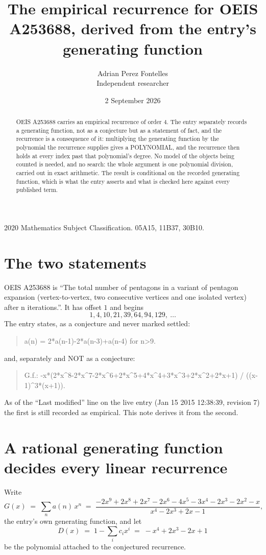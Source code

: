 \documentclass[11pt,a4paper]{article}
\title{The empirical recurrence for OEIS A253688, derived from the entry's generating function}
\author{Adrian Perez Fontelles\\ \small Independent researcher}
\date{2 September 2026}
\theoremstyle{plain}
\theoremstyle{definition}
\begin{document}
\maketitle

\begin{abstract}
OEIS A253688 carries an empirical recurrence of order $4$. The entry separately records a
generating function, not as a conjecture but as a statement of fact, and the recurrence is a
consequence of it: multiplying the generating function by the polynomial the recurrence
supplies gives a POLYNOMIAL, and the recurrence then holds at every index past that
polynomial's degree. No model of the objects being counted is needed, and no search: the
whole argument is one polynomial division, carried out in exact arithmetic. The result is
conditional on the recorded generating function, which is what the entry asserts and what is
checked here against every published term.
\end{abstract}

\noindent\small 2020 Mathematics Subject Classification. 05A15, 11B37, 30B10.\normalsize

\section{The two statements}

OEIS A253688 is ``The total number of pentagons in a variant of pentagon expansion (vertex-to-vertex, two consecutive vertices and one isolated vertex) after n iterations.''. It has offset $1$ and begins
\[
1, 4, 10, 21, 39, 64, 94, 129,\ \dots
\]
The entry states, as a conjecture and never marked settled:
\begin{quote}
a(n) = 2*a(n-1)-2*a(n-3)+a(n-4) for n>9.
\end{quote}
and, separately and NOT as a conjecture:
\begin{quote}
G.f.: -x*(2*x\^{}8-2*x\^{}7-2*x\^{}6+2*x\^{}5+4*x\^{}4+3*x\^{}3+2*x\^{}2+2*x+1) / ((x-1)\^{}3*(x+1)).
\end{quote}
As of the ``Last modified'' line on the live entry (Jan 15 2015 12:38:39, revision 7) the first is still
recorded as empirical. This note derives it from the second.

\section{A rational generating function decides every linear recurrence}

Write
\[
G(x)\;=\;\sum_{n}a(n)\,x^{n}\;=\;\frac{- 2 x^{9} + 2 x^{8} + 2 x^{7} - 2 x^{6} - 4 x^{5} - 3 x^{4} - 2 x^{3} - 2 x^{2} - x}{x^{4} - 2 x^{3} + 2 x - 1},
\]
the entry's own generating function, and let
\[
D(x)\;=\;1-\sum_i c_i x^{i}\;=\;- x^{4} + 2 x^{3} - 2 x + 1
\]
be the polynomial attached to the conjectured recurrence.
\end{document}
